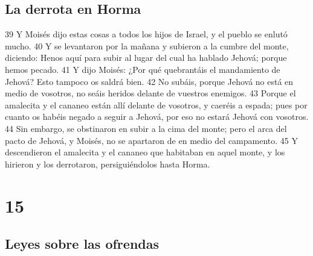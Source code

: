 \section*{La derrota en Horma }

39 Y Moisés dijo estas cosas a todos los hijos de Israel, y el pueblo se enlutó mucho.
40 Y se levantaron por la mañana y subieron a la cumbre del monte, diciendo: Henos aquí para subir al lugar del cual ha hablado Jehová; porque hemos pecado.
41 Y dijo Moisés: ¿Por qué quebrantáis el mandamiento de Jehová? Esto tampoco os saldrá bien.
42 No subáis, porque Jehová no está en medio de vosotros, no seáis heridos delante de vuestros enemigos.
43 Porque el amalecita y el cananeo están allí delante de vosotros, y caeréis a espada; pues por cuanto os habéis negado a seguir a Jehová, por eso no estará Jehová con vosotros.
44 Sin embargo, se obstinaron en subir a la cima del monte; pero el arca del pacto de Jehová, y Moisés, no se apartaron de en medio del campamento.
45 Y descendieron el amalecita y el cananeo que habitaban en aquel monte, y los hirieron y los derrotaron, persiguiéndolos hasta Horma.

\chapter{15}

\section*{Leyes sobre las ofrendas}


